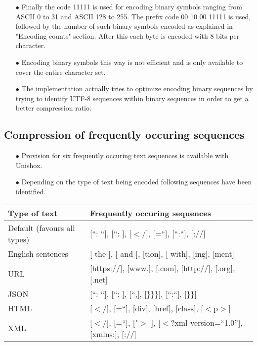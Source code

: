 \documentclass[]{article}
\begin{document}
\begin{itemize}
	\item[$\bullet$] Finally the code 11111 is used for encoding binary symbols ranging from ASCII 0 to 31 and ASCII 128 to 255. The prefix code 00 10 00 11111 is used, followed by the number of such binary symbols encoded as explained in "Encoding counts" section. After this each byte is encoded with 8 bits per character.
	\item[$\bullet$] Encoding binary symbols this way is not efficient and is only available to cover the entire character set.
	\item[$\bullet$] The implementation actually tries to optimize encoding binary sequences by trying to identify UTF-8 sequences within binary sequences in order to get a better compression ratio. 
\end{itemize}

\subsection{Compression of frequently occuring sequences}
\begin{itemize}
	\item[$\bullet$] Provision for six frequently occuring text sequences is available with Unishox.
	\item[$\bullet$] Depending on the type of text being encoded following sequences have been identified.
\end{itemize}
\begin{tabular}{ | l | l |} \hline
	﻿\textbf{Type of text} & ﻿\textbf{Frequently occuring sequences} \\ \hline
	Default (favours all types) & [\textquotedblleft: \textquotedblleft], [\textquotedblleft: ], [$<$/], [=\textquotedblleft], [\textquotedblleft:\textquotedblleft], [://] \\ \hline
	English sentences & [ the ], [ and ], [tion], [ with], [ing], [ment] \\ \hline
	URL & [https://], [www.], [.com], [http://], [.org], [.net] \\ \hline
	JSON & [\textquotedblleft: \textquotedblleft], [\textquotedblleft: ], [\textquotedblleft,], [\}\}\}], [\textquotedblleft:\textquotedblleft], [\}\}] \\ \hline
	HTML & [$<$/], [=\textquotedblleft], [div], [href], [class], [$<$p$>$] \\ \hline
	XML & [$<$/], [=\textquotedblleft], ["$>$ ], [$<$?xml version=\textquotedblleft1.0\textquotedblright], [xmlns:], [://] \\ \hline
\end{tabular}
\end{document}
